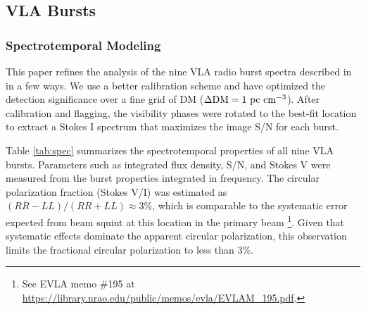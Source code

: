 \documentclass[twocolumn]{aastex61}
\begin{document}
\subsection{VLA Bursts}
\label{sec:vla}

\subsubsection{Spectrotemporal Modeling}
\label{sec:spec}

This paper refines the analysis of the nine VLA radio burst spectra described in \citet{LOC} in a few ways. We use a better calibration scheme and have optimized the detection significance over a fine grid of DM ($\Delta \rm{DM}=1\ \rm{pc}\ \rm{cm}^{-3}$). After calibration and flagging, the visibility phases were rotated to the best-fit location \citep[RA, Dec $=$ 05h31m58.70s, +33d08m52.5s;][]{LOC} to extract a Stokes I spectrum that maximizes the image S/N for each burst.

Table \ref{tab:spec} summarizes the spectrotemporal properties of all nine VLA bursts. Parameters such as integrated flux density, S/N, and Stokes V were measured from the burst properties integrated in frequency. The circular polarization fraction (Stokes V/I) was estimated as $(RR-LL)/(RR+LL)\approx3\%$, which is comparable to the systematic error expected from beam squint at this location in the primary beam \footnote{See EVLA memo \#195 at \url{https://library.nrao.edu/public/memos/evla/EVLAM_195.pdf}.}. Given that systematic effects dominate the apparent circular polarization, this observation limits the fractional circular polarization to less than 3\%.
\end{document}
